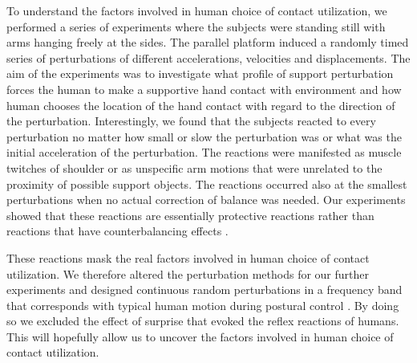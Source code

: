 To understand the factors involved in human choice of contact utilization, we performed a series of experiments where the subjects were standing still with arms hanging freely at the sides. The parallel platform induced a randomly timed series of perturbations of different accelerations, velocities and displacements. The aim of the experiments was to investigate what profile of support perturbation forces the human to make a supportive hand contact with environment and how human chooses the location of the hand contact with regard to the direction of the perturbation. Interestingly, we found that the subjects reacted to every perturbation no matter how small or slow the perturbation was or what was the initial acceleration of the perturbation. The reactions were manifested as muscle twitches of shoulder or as unspecific arm motions that were unrelated to the proximity of possible support objects. The reactions occurred also at the smallest perturbations when no actual correction of balance was needed. Our 
experiments showed that these reactions are essentially protective reactions rather than reactions that have counterbalancing effects \cite{McIlroy1995, Corbeil2013}.

These reactions mask the real factors involved in human choice of contact utilization. We therefore altered the perturbation methods for our further experiments and designed continuous random perturbations in a frequency band that corresponds with typical human motion during postural control \cite{Nawayseh2006}. By doing so we excluded the effect of surprise that evoked the reflex reactions of humans. This will hopefully allow us to uncover the factors involved in human choice of contact utilization.

